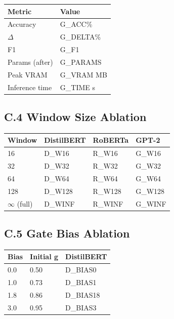 \begin{table}[H]
\centering
\small
\begin{tabular}{ll}
\toprule
\textbf{Metric} & \textbf{Value} \\
\midrule
Accuracy & {{G\_ACC}}\% \\
$\Delta$ & {{G\_DELTA}}\% \\
F1 & {{G\_F1}} \\
Params (after) & {{G\_PARAMS}} \\
Peak VRAM & {{G\_VRAM}} MB \\
Inference time & {{G\_TIME}} s \\
\bottomrule
\end{tabular}
\end{table}

\subsection{C.4 Window Size Ablation}

\begin{table}[H]
\centering
\small
\begin{tabular}{llll}
\toprule
\textbf{Window} & \textbf{DistilBERT} & \textbf{RoBERTa} & \textbf{GPT-2} \\
\midrule
16 & {{D\_W16}} & {{R\_W16}} & {{G\_W16}} \\
32 & {{D\_W32}} & {{R\_W32}} & {{G\_W32}} \\
64 & {{D\_W64}} & {{R\_W64}} & {{G\_W64}} \\
128 & {{D\_W128}} & {{R\_W128}} & {{G\_W128}} \\
$\infty$ (full) & {{D\_WINF}} & {{R\_WINF}} & {{G\_WINF}} \\
\bottomrule
\end{tabular}
\end{table}

\subsection{C.5 Gate Bias Ablation}

\begin{table}[H]
\centering
\small
\begin{tabular}{lll}
\toprule
\textbf{Bias} & \textbf{Initial g} & \textbf{DistilBERT} \\
\midrule
0.0 & 0.50 & {{D\_BIAS0}} \\
1.0 & 0.73 & {{D\_BIAS1}} \\
1.8 & 0.86 & {{D\_BIAS18}} \\
3.0 & 0.95 & {{D\_BIAS3}} \\
\bottomrule
\end{tabular}
\end{table}

